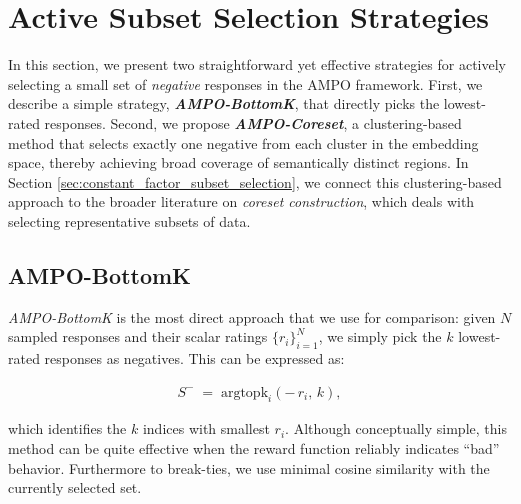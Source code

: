 \vspace{-0.15in}
\section{Active Subset Selection Strategies}
\label{sec:subset_selection_strategies}

\vspace{-0.1in}
In this section, we present two straightforward yet effective strategies for actively selecting a small set of \emph{negative} responses in the \textsc{AMPO} framework. First, we describe a simple strategy, \emph{\textbf{AMPO-BottomK}}, that directly picks the lowest-rated responses. Second, we propose \emph{\textbf{AMPO-Coreset}}, a clustering-based method that selects exactly one negative from each cluster in the embedding space, thereby achieving broad coverage of semantically distinct regions. In Section \ref{sec:constant_factor_subset_selection}, we connect this clustering-based approach to the broader literature on \emph{coreset construction}, which deals with selecting representative subsets of data.

\vspace{-0.1in}
\subsection{AMPO-BottomK}
\label{sec:ampo_bottomk}

\vspace{-0.05in}
\noindent
\emph{AMPO-BottomK} is the most direct approach that we use for comparison: given $N$ sampled responses and their scalar ratings $\{r_i\}_{i=1}^N$, we simply pick the $k$ lowest-rated responses as negatives. This can be expressed as:

\vspace{-0.25in}
\begin{align}
\label{eq:bottomk_negatives}
S^- \;=\; \mathrm{argtopk}_{i}(-\,r_i,\,k),
\end{align}

\vspace{-0.1in}
which identifies the $k$ indices with smallest $r_i$. Although conceptually simple, this method can be quite effective when the reward function reliably indicates “bad” behavior. 
Furthermore to break-ties, we use minimal cosine similarity with the currently selected set.



